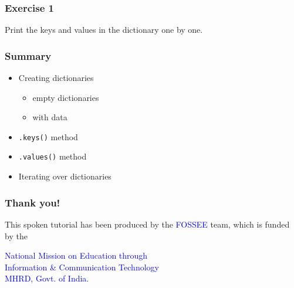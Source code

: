 \documentclass[presentation]{beamer}
\begin{document}
\begin{frame}
\frametitle{Exercise 1}
\label{sec-8}

  Print the keys and values in the dictionary one by one.
\end{frame}
\begin{frame}
\frametitle{Summary}
\label{sec-9}

\begin{itemize}
\item Creating dictionaries

\begin{itemize}
\item empty dictionaries
\item with data
\end{itemize}

\item \texttt{.keys()} method
\item \texttt{.values()} method
\item Iterating over dictionaries
\end{itemize}
\end{frame}
\begin{frame}
\frametitle{Thank you!}
\label{sec-10}

  \begin{block}{}
  \begin{center}
  This spoken tutorial has been produced by the
  \textcolor{blue}{FOSSEE} team, which is funded by the 
  \end{center}
  \begin{center}
    \textcolor{blue}{National Mission on Education through \\
      Information \& Communication Technology \\ 
      MHRD, Govt. of India}.
  \end{center}  
  \end{block}
\end{frame}
\end{document}
